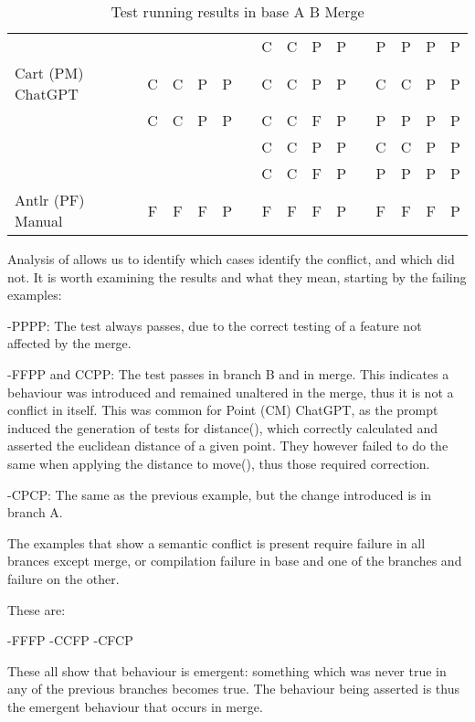 \begin{table}[t]
\begin{tabular}{@{\extracolsep{\fill}} llcccccccccccccc}
                            & &   &   &   &   & & C & C & P & P & & P & P & P & P \\ 
Cart (PM) ChatGPT           & & C & C & P & P & & C & C & P & P & & C & C & P & P \\
                            & & C & C & P & P & & C & C & F & P & & P & P & P & P \\
                            & &   &   &   &   & & C & C & P & P & & C & C & P & P \\
                            & &   &   &   &   & & C & C & F & P & & P & P & P & P \\
Antlr (PF) Manual           & & F & F & F & P & & F & F & F & P & & F & F & F & P \\ 
        \bottomrule
    \end{tabular}
    \caption{Test running results in base A B Merge \label{tab:results:rq2tests}}
\end{table}


Analysis of  allows us to identify which cases identify the conflict, and which did not.
It is worth examining the results and what they mean, starting by the failing examples:

-PPPP: The test always passes, due to the correct testing of a feature not affected by the merge.

-FFPP and CCPP: The test passes in branch B and in merge. This indicates a behaviour was introduced and remained unaltered in the merge, thus it is not a conflict in itself.
This was common for Point (CM) ChatGPT, as the prompt induced the generation of tests for distance(), which correctly calculated and asserted the euclidean distance of a given point.
They however failed to do the same when applying the distance to move(), thus those required correction.

-CPCP: The same as the previous example, but the change introduced is in branch A.

The examples that show a semantic conflict is present require failure in all brances except merge, or compilation failure in base and one of the branches and failure on the other.

These are:

-FFFP
-CCFP
-CFCP

These all show that behaviour is emergent: something which was never true in any of the previous branches becomes true. The behaviour being asserted is thus the 
emergent behaviour that occurs in merge.

